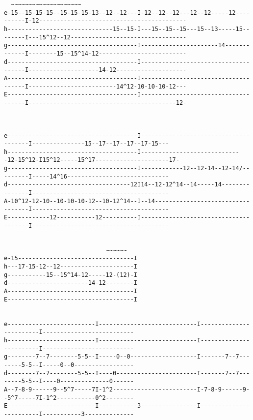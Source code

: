 \begin{verbatim}
  ~~~~~~~~~~~~~~~~~~~~
e-15--15-15-15--15-15-15-13--12--12---I-12--12--12---12--12-----12----------I-12------------------------------------------
h------------------------------15--15-I---15--15--15---15--13-----15--------I---15^12--12---------------------------------
g-------------------------------------I----------------------14-------------I--------15--15^14-12-------------------------
d-------------------------------------I-------------------------------------I--------------------14-12--------------------
A-------------------------------------I-------------------------------------I-------------------------14^12-10-10-10-12---
E-------------------------------------I-------------------------------------I------------------------------------------12-



e-------------------------------------I--------------------------------------I---------------15--17--17--17--17-15---
h-------------------------------------I-----------------------------12-15^12-I15^12-----15^17---------------------17-
g-------------------------------------I------------12--12-14--12-14/---------I-----14^16-----------------------------
d-----------------------------------12I14--12-12^14--14-----14---------------I---------------------------------------
A-10^12-12-10--10-10-10-12--10-12^14--I--14----------------------------------I---------------------------------------
E------------12-----------12----------I--------------------------------------I---------------------------------------


                             ~~~~~~
e-15---------------------------------I
h---17-15-12--12---------------------I
g-----------15--15^14-12-----12-(12)-I
d-----------------------14-12--------I
A------------------------------------I
E------------------------------------I


e-------------------------I----------------------------I------------------------I--------------------------
h-------------------------I----------------------------I------------------------I--------------------------
g--------7--7--------5-5--I-----0--0-------------------I-------7--7--------5-5--I-----0--0-----------------
d--------7--7--------5-5--I----0-----------------------I-------7--7--------5-5--I----0--------------0------
A--7-8-9------9--5^7-----7I-1^2------------------------I-7-8-9------9--5^7-----7I-1^2-----------0^2--------
E-------------------------I-----------3----------------I------------------------I-----------3--------------




\end{verbatim}
